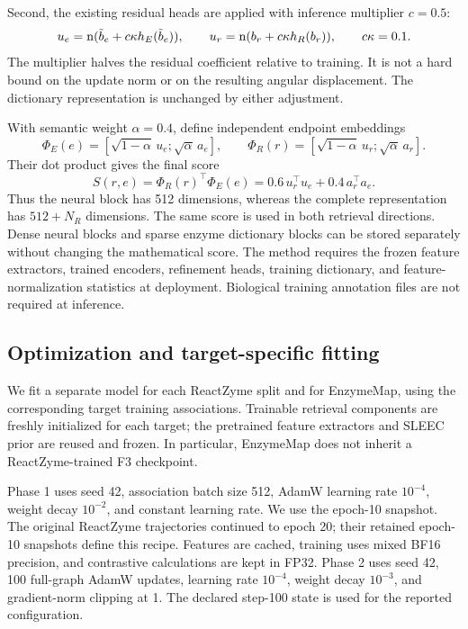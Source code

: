 Second, the existing residual heads are applied with inference multiplier
$c=0.5$:
\begin{equation}
  u_e=\operatorname{n}(\tilde b_e+c\kappa h_E(\tilde b_e)),\qquad
  u_r=\operatorname{n}(b_r+c\kappa h_R(b_r)),\qquad c\kappa=0.1.
  \label{eq:v4-inference-residual}
\end{equation}
The multiplier halves the residual coefficient relative to training. It is
not a hard bound on the update norm or on the resulting angular displacement.
The dictionary representation is unchanged by either adjustment.

With semantic weight $\alpha=0.4$, define independent endpoint embeddings
\begin{equation}
  \Phi_E(e)=[\sqrt{1-\alpha}\,u_e;\sqrt{\alpha}\,a_e],\qquad
  \Phi_R(r)=[\sqrt{1-\alpha}\,u_r;\sqrt{\alpha}\,a_r].
  \label{eq:v4-concatenation}
\end{equation}
Their dot product gives the final score
\begin{equation}
  \boxed{S(r,e)=\Phi_R(r)^\top\Phi_E(e)
       =0.6\,u_r^\top u_e+0.4\,a_r^\top a_e.}
  \label{eq:v4-final-score}
\end{equation}
Thus the neural block has 512 dimensions, whereas the complete representation
has $512+N_R$ dimensions. The same score is used in both retrieval directions.
Dense neural blocks and sparse enzyme dictionary blocks can be stored
separately without changing the mathematical score. The method requires the
frozen feature extractors, trained encoders, refinement heads, training
dictionary, and feature-normalization statistics at deployment. Biological
training annotation files are not required at inference.

\subsection{Optimization and target-specific fitting}
\label{sec:v4-optimization}
We fit a separate model for each ReactZyme split and for EnzymeMap, using the
corresponding target training associations. Trainable retrieval components
are freshly initialized for each target; the pretrained feature extractors
and SLEEC prior are reused and frozen. In particular, EnzymeMap does not
inherit a ReactZyme-trained F3 checkpoint.

Phase 1 uses seed 42, association batch size 512, AdamW learning rate
$10^{-4}$, weight decay $10^{-2}$, and constant learning rate. We use the
epoch-10 snapshot. The original ReactZyme trajectories continued to epoch 20;
their retained epoch-10 snapshots define this recipe. Features are cached,
training uses mixed BF16 precision, and contrastive calculations are kept in
FP32. Phase 2 uses seed 42, 100 full-graph AdamW updates, learning rate
$10^{-4}$, weight decay $10^{-3}$, and gradient-norm clipping at 1. The
declared step-100 state is used for the reported configuration.

